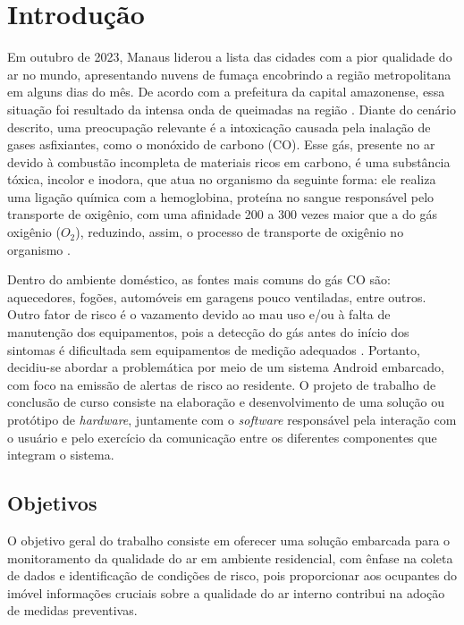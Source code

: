 \chapter{Introdução}

Em outubro de 2023, Manaus liderou a lista das cidades com a pior qualidade do ar no mundo, apresentando nuvens de fumaça encobrindo a região metropolitana em alguns dias do mês. De acordo com a prefeitura da capital amazonense, essa situação foi resultado da intensa onda de queimadas na região \cite{G1-ar-manaus}. Diante do cenário descrito, uma preocupação relevante é a intoxicação causada pela inalação de gases asfixiantes, como o monóxido de carbono (CO). Esse gás, presente no ar devido à combustão incompleta de materiais ricos em carbono, é uma substância tóxica, incolor e inodora, que atua no organismo da seguinte forma: ele realiza uma ligação química com a hemoglobina, proteína no sangue responsável pelo transporte de oxigênio, com uma afinidade 200 a 300 vezes maior que a do gás oxigênio ($O_{2}$), reduzindo, assim, o processo de transporte de oxigênio no organismo \cite{carbon-monoxide-poisoning-varon}.

Dentro do ambiente doméstico, as fontes mais comuns do gás CO são: aquecedores, fogões, automóveis em garagens pouco ventiladas, entre outros. Outro fator de risco é o vazamento devido ao mau uso e/ou à falta de manutenção dos equipamentos, pois a detecção do gás antes do início dos sintomas é dificultada sem equipamentos de medição adequados \cite{bio-sufocantes-hernandez2022}. Portanto, decidiu-se abordar a problemática por meio de um sistema Android embarcado, com foco na emissão de alertas de risco ao residente. O projeto de trabalho de conclusão de curso consiste na elaboração e desenvolvimento de uma solução ou protótipo de \textit{hardware}, juntamente com o \textit{software} responsável pela interação com o usuário e pelo exercício da comunicação entre os diferentes componentes que integram o sistema. 

\section{Objetivos}

O objetivo geral do trabalho consiste em oferecer uma solução embarcada para o monitoramento da qualidade do ar em ambiente residencial, com ênfase na coleta de dados e identificação de condições de risco, pois  proporcionar aos ocupantes do imóvel informações cruciais sobre a qualidade do ar interno  contribui na adoção de medidas preventivas.

